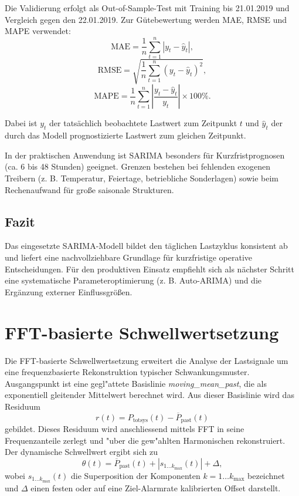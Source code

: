 \documentclass[12pt,oneside]{article}
\begin{document}
Die Validierung erfolgt als Out-of-Sample-Test mit Training bis 21.01.2019 und
Vergleich gegen den 22.01.2019. Zur Gütebewertung werden MAE, RMSE und MAPE
verwendet:
\begin{equation}
  \text{MAE} = \frac{1}{n} \sum_{t=1}^{n} |y_t - \hat{y}_t|,
\end{equation}
\begin{equation}
  \text{RMSE} = \sqrt{\frac{1}{n} \sum_{t=1}^{n} (y_t - \hat{y}_t)^2},
\end{equation}
\begin{equation}
  \text{MAPE} = \frac{1}{n} \sum_{t=1}^{n} \left|\frac{y_t - \hat{y}_t}{y_t}\right| \times 100\%.
\end{equation}

Dabei ist $y_t$ der tatsächlich beobachtete Lastwert zum Zeitpunkt $t$ und
$\hat{y}_t$ der durch das Modell prognostizierte Lastwert zum gleichen
Zeitpunkt.

In der praktischen Anwendung ist SARIMA besonders für Kurzfristprognosen
(ca. 6 bis 48 Stunden) geeignet. Grenzen bestehen bei fehlenden exogenen
Treibern (z. B. Temperatur, Feiertage, betriebliche Sonderlagen) sowie beim
Rechenaufwand für große saisonale Strukturen.

\subsection{Fazit}

Das eingesetzte SARIMA-Modell bildet den täglichen Lastzyklus konsistent ab
und liefert eine nachvollziehbare Grundlage für kurzfristige operative
Entscheidungen. Für den produktiven Einsatz empfiehlt sich als nächster Schritt
eine systematische Parameteroptimierung (z. B. Auto-ARIMA) und die Ergänzung
externer Einflussgrößen.

\section{FFT-basierte Schwellwertsetzung}
\label{sec:teil2_fft_schwellwert}

Die FFT-basierte Schwellwertsetzung erweitert die Analyse der Lastsignale um eine
frequenzbasierte Rekonstruktion typischer Schwankungsmuster. Ausgangspunkt ist eine
gegl"attete Basislinie \emph{moving\_mean\_past}, die als exponentiell gleitender
Mittelwert berechnet wird. Aus dieser Basislinie wird das Residuum
\[
r(t)=P_{\mathrm{totsys}}(t)-\overline{P}_{\mathrm{past}}(t)
\]
gebildet. Dieses Residuum wird anschliessend mittels FFT in seine Frequenzanteile
zerlegt und "uber die gew"ahlten Harmonischen rekonstruiert. Der dynamische
Schwellwert ergibt sich zu
\[
\theta(t)=\overline{P}_{\mathrm{past}}(t)+\left|s_{1\dots k_{\max}}(t)\right|+\Delta,
\]
wobei $s_{1\dots k_{\max}}(t)$ die Superposition der Komponenten $k=1\dots k_{\max}$
bezeichnet und $\Delta$ einen festen oder auf eine Ziel-Alarmrate kalibrierten
Offset darstellt.
\end{document}
